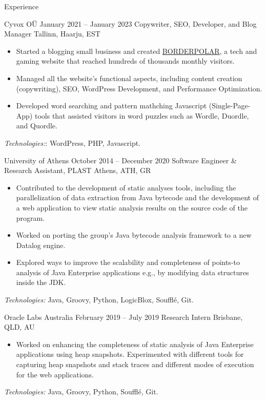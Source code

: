 \documentclass{resume}
\begin{document}
\begin{rSection}{Experience}
  \begin{rSubsection}
    {Cyvox OÜ}
    {January 2021 -- January 2023}
    {Copywriter, SEO, Developer, and Blog Manager}
    {Tallinn, Haarju, EST}
    \begin{itemize}[label={-}]
      \setlength\itemsep{-0.5em}
        \item Started a blogging small business and created \href{http://borderpolar.com}{BORDERPOLAR}, a tech and gaming website that reached hundreds of thousands monthly visitors.
        \item Managed all the website's functional aspects, including content creation (copywriting), SEO, WordPress Development, and Performance Optimization.
        \item Developed word searching and pattern mathching Javascript (Single-Page-App) tools that assisted visitors in word puzzles such as Wordle, Duordle, and Quordle.
    \end{itemize}
  \footnotesize\textcolor{TechsColor}{\textit{Technologies:}: WordPress, PHP, Javascript.}\\
  \end{rSubsection}

\begin{rSubsection}
  {University of Athens}
  {October 2014 -- December 2020}
  {Software Engineer \& Research Assistant, PLAST}
  {Athens, ATH, GR}
  \begin{itemize}[label={-}]
    \setlength\itemsep{-0.5em}
    \item Contributed to the development of static analyses tools, including the parallelization of data extraction from Java bytecode and the development of a web application to view static analysis results on the source code of the program.
    \item Worked on porting the group's Java bytecode analysis framework to a new Datalog engine.
    \item Explored ways to improve the scalability and completeness of points-to analysis of Java Enterprise applications e.g., by modifying data structures inside the JDK.
  \end{itemize}
\footnotesize\textcolor{TechsColor}{\textit{Technologies:} Java, Groovy, Python, LogicBlox, Soufflé, Git.}\\
\end{rSubsection}

\begin{rSubsection}
  {Oracle Labs Australia}
  {February 2019 -- July 2019}
  {Research Intern}
  {Brisbane, QLD, AU}
  \begin{itemize}[label={-}]
    \setlength\itemsep{-0.5em}
    \item Worked on enhancing the completeness of static analysis of Java Enterprise applications using heap snapshots. Experimented with different tools for capturing heap snapshots and stack traces and different modes of execution for the web applications.
  \end{itemize}
\footnotesize\textcolor{TechsColor}{\textit{Technologies:} Java, Groovy, Python, Soufflé, Git.}\\
\end{rSubsection}


\end{rSection}
\end{document}
